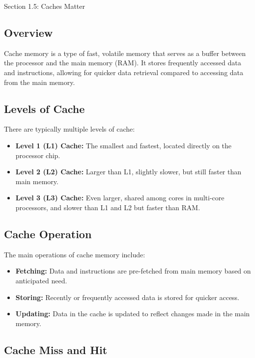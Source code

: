 \begin{notes}{Section 1.5: Caches Matter}
    \subsection*{Overview}

    Cache memory is a type of fast, volatile memory that serves as a buffer between the processor and the main memory (RAM). It stores frequently accessed data and instructions, allowing for quicker 
    data retrieval compared to accessing data from the main memory. \vspace*{1em}
    
    \subsection*{Levels of Cache}

    There are typically multiple levels of cache:

    \begin{itemize}
        \item \textbf{Level 1 (L1) Cache:} The smallest and fastest, located directly on the processor chip.
        \item \textbf{Level 2 (L2) Cache:} Larger than L1, slightly slower, but still faster than main memory.
        \item \textbf{Level 3 (L3) Cache:} Even larger, shared among cores in multi-core processors, and slower than L1 and L2 but faster than RAM.
    \end{itemize}
    
    \subsection*{Cache Operation}

    The main operations of cache memory include:

    \begin{itemize}
        \item \textbf{Fetching:} Data and instructions are pre-fetched from main memory based on anticipated need.
        \item \textbf{Storing:} Recently or frequently accessed data is stored for quicker access.
        \item \textbf{Updating:} Data in the cache is updated to reflect changes made in the main memory.
    \end{itemize}
    
    \subsection*{Cache Miss and Hit}


\end{notes}
